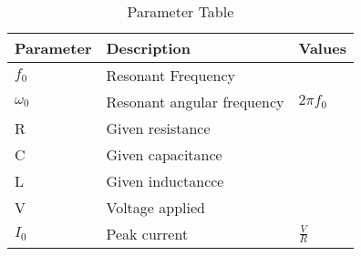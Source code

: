 \begin{table}[!ht] 
\centering
\setlength{\extrarowheight}{8pt}
\begin{tabular}{|l|l|l|}
    \hline
    \textbf{Parameter} & \textbf{Description} & \textbf{Values}\\
    \hline
     $f_0$ & Resonant Frequency & \\\hline
     $\omega_0$ & Resonant angular frequency & $2\pi f_0$ \\\hline
     R & Given resistance & \\\hline
     C & Given capacitance & \\\hline
     L & Given inductancce & \\\hline
     V & Voltage applied & \\\hline
     $I_0$ & Peak current & $\frac{V}{R}$ \\\hline
  \end{tabular}
  \vspace{4mm}
 \caption{Parameter Table}
 \label{tab:table0_ee_22_39}
\end{table}
